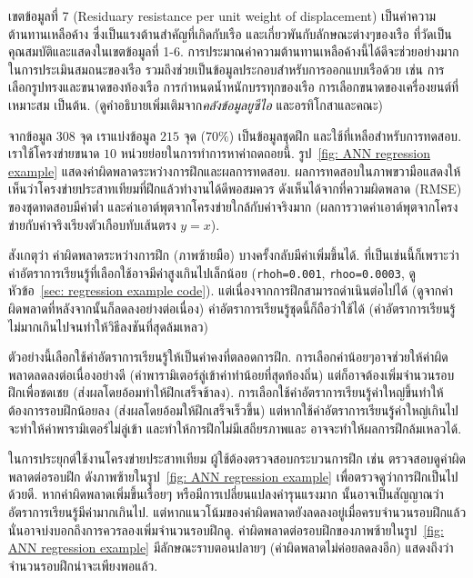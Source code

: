 เขตข้อมูลที่ 7 (Residuary resistance per unit weight of displacement) เป็นค่าความต้านทานเหลือค้าง ซึ่งเป็นแรงต้านสำคัญที่เกิดกับเรือ และเกี่ยวพันกับลักษณะต่างๆของเรือ ที่วัดเป็นคุณสมบัติและแสดงในเขตข้อมูลที่ 1-6. 
การประมาณค่าความต้านทานเหลือค้างนี้ได้ดีจะช่วยอย่างมากในการประเมินสมถนะของเรือ 
รวมถึงช่วยเป็นข้อมูลประกอบสำหรับการออกแบบเรือด้วย เช่น การเลือกรูปทรงและขนาดของท้องเรือ การกำหนดน้ำหนักบรรทุกของเรือ การเลือกขนาดของเครื่องยนต์ที่เหมาะสม เป็นต้น.
(ดูคำอธิบายเพิ่มเติมจาก\textit{คลังข้อมูลยูซีไอ} และอรทิโกสาและคณะ\cite{OrtigosaEtAl2007a})

จากข้อมูล $308$ จุด เราแบ่งข้อมูล $215$ จุด ($70\%$) เป็นข้อมูลชุดฝึก และใช้ที่เหลือสำหรับการทดสอบ.
เราใช้โครงข่ายขนาด $10$ หน่วยย่อยในการทำการหาค่าถดถอยนี้.
รูป~\ref{fig: ANN regression example} แสดงค่าผิดพลาดระหว่างการฝึกและผลการทดสอบ.
ผลการทดสอบในภาพขวามือแสดงให้เห็นว่าโครงข่ายประสาทเทียมที่ฝึกแล้วทำงานได้ดีพอสมควร
ดังเห็นได้จากที่ความผิดพลาด (RMSE) ของชุดทดสอบมีค่าต่ำ และค่าเอาต์พุตจากโครงข่ายใกล้กับค่าจริงมาก (ผลการวาดค่าเอาต์พุตจากโครงข่ายกับค่าจริงเรียงตัวเกือบทับเส้นตรง $y = x$).

สังเกตุว่า ค่าผิดพลาดระหว่างการฝึก (ภาพซ้ายมือ) บางครั้งกลับมีค่าเพิ่มขึ้นได้.
ที่เป็นเช่นนี้ก็เพราะว่า ค่าอัตราการเรียนรู้ที่เลือกใช้อาจมีค่าสูงเกินไปเล็กน้อย (\texttt{rhoh=0.001}, \texttt{rhoo=0.0003}, ดูหัวข้อ~\ref{sec: regression example code}).
แต่เนื่องจากการฝึกสามารถดำเนินต่อไปได้ (ดูจากค่าผิดพลาดที่หลังจากนั้นก็ลดลงอย่างต่อเนื่อง)
ค่าอัตราการเรียนรู้ชุดนี้ก็ถือว่าใช้ได้ (ค่าอัตราการเรียนรู้ไม่มากเกินไปจนทำให้วิธีลงชันที่สุดล้มเหลว)

ตัวอย่างนี้เลือกใช้ค่าอัตราการเรียนรู้ให้เป็นค่าคงที่ตลอดการฝึก.
การเลือกค่าน้อยๆอาจช่วยให้ค่าผิดพลาดลดลงต่อเนื่องอย่างดี (ค่าพารามิเตอร์ลู่เข้าค่าทำน้อยที่สุดท้องถิ่น) แต่ก็อาจต้องเพิ่มจำนวนรอบฝึกเพื่อชดเชย (ส่งผลโดยอ้อมทำให้ฝึกเสร็จช้าลง).
การเลือกใช้ค่าอัตราการเรียนรู้ค่าใหญ่ขึ้นทำให้ต้องการรอบฝึกน้อยลง (ส่งผลโดยอ้อมให้ฝึกเสร็จเร็วขึ้น)
แต่หากใช้ค่าอัตราการเรียนรู้ค่าใหญ่เกินไปจะทำให้ค่าพารามิเตอร์ไม่ลู่เข้า และทำให้การฝึกไม่มีเสถียรภาพและ อาจจะทำให้ผลการฝึกล้มเหลวได้.

ในการประยุกต์ใช้งานโครงข่ายประสาทเทียม ผู้ใช้ต้องตรวจสอบกระบวนการฝึก เช่น ตรวจสอบดูค่าผิดพลาดต่อรอบฝึก ดังภาพซ้ายในรูป~\ref{fig: ANN regression example} เพื่อตรวจดูว่าการฝึกเป็นไปด้วยดี.
หากค่าผิดพลาดเพิ่มขึ้นเรื่อยๆ หรือมีการเปลี่ยนแปลงค่ารุนแรงมาก นั้นอาจเป็นสัญญาณว่าอัตราการเรียนรู้มีค่ามากเกินไป.
แต่หากแนวโน้มของค่าผิดพลาดยังลดลงอยู่เมื่อครบจำนวนรอบฝึกแล้ว นั่นอาจบ่งบอกถึงการควรลองเพิ่มจำนวนรอบฝึกดู.
ค่าผิดพลาดต่อรอบฝึกของภาพซ้ายในรูป~\ref{fig: ANN regression example} มีลักษณะราบตอนปลายๆ (ค่าผิดพลาดไม่ค่อยลดลงอีก) แสดงถึงว่าจำนวนรอบฝึกน่าจะเพียงพอแล้ว.

